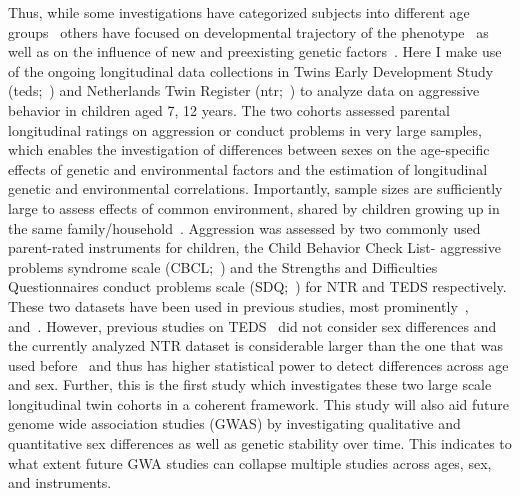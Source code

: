 Thus, while some investigations have categorized subjects into different age groups~\cite{Niv2013} others have focused on developmental trajectory of the phenotype~\cite{Pingault2015} as well as on the influence of new and preexisting genetic factors~\cite{vanBeijsterveldt2003}. 
Here I make use of the ongoing longitudinal data collections in Twins Early Development Study (\acrshort{teds};~\cite{Haworth2012}) and Netherlands Twin Register (\acrshort{ntr};~\cite{Willemsen2013a}) to analyze data on aggressive behavior in children aged 7, 12 years.
The two cohorts assessed parental longitudinal ratings on aggression or conduct problems in very large samples, which enables the investigation of differences between sexes on the age-specific effects of genetic and environmental factors and the estimation of longitudinal genetic and environmental correlations.
Importantly, sample sizes are sufficiently large to assess effects of common environment, shared by children growing up in the same family/household~\cite{Martin1978, Posthuma2000}. 
Aggression was assessed by two commonly used parent-rated instruments for children, the Child Behavior Check List- aggressive problems syndrome scale (CBCL;~\cite{Achenbach2003}) and the Strengths and Difficulties Questionnaires conduct problems scale (SDQ;~\cite{Goodman1997}) for NTR and TEDS respectively. 
These two datasets have been used in previous studies, most prominently~\citet{Lewis2015},~\citet{Pingault2015} and~\citet{vanBeijsterveldt2003}.
However, previous studies on TEDS~\cite{Lewis2015, Pingault2015} did not consider sex differences and the currently analyzed NTR dataset is considerable larger than the one that was used before~\cite{vanBeijsterveldt2003} and thus has higher statistical power to detect differences across age and sex.
Further, this is the first study which investigates these two large scale longitudinal twin cohorts in a coherent framework.
This study will also aid future genome wide association studies (GWAS) by investigating qualitative and quantitative sex differences as well as genetic stability over time.
This indicates to what extent future GWA studies can collapse multiple studies across ages, sex, and instruments.
